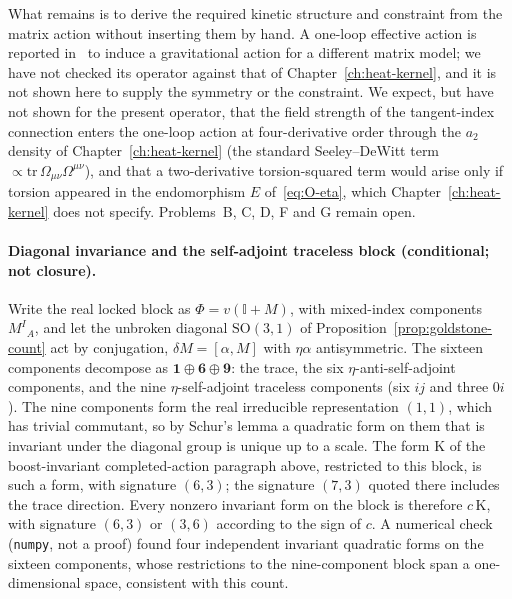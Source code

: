 What remains is to derive the required kinetic structure and constraint from
the matrix action without inserting them by hand.  A one-loop effective action
is reported in~\cite{MantaSteinackerTran2024} to induce a gravitational action
for a different matrix model; we have not checked its operator against that of
Chapter~\ref{ch:heat-kernel}, and it is not shown here to supply the symmetry
or the constraint.  We expect, but have not shown for the present operator,
that the field strength of the tangent-index connection enters the one-loop
action at four-derivative order through the \(a_2\) density of
Chapter~\ref{ch:heat-kernel} (the standard Seeley--DeWitt term
\(\propto\mathrm{tr}\,\Omega_{\mu\nu}\Omega^{\mu\nu}\)), and that a
two-derivative torsion-squared term would arise only if torsion appeared in
the endomorphism \(E\) of~\eqref{eq:O-eta}, which
Chapter~\ref{ch:heat-kernel} does not specify.  Problems~B, C, D, F and G
remain open.

\paragraph{Diagonal invariance and the self-adjoint traceless block
(conditional; not closure).}
Write the real locked block as \(\Phi=v(\mathbb{I}+M)\), with
mixed-index components \(M^I{}_A\), and let the unbroken diagonal
\(\mathrm{SO}(3,1)\) of Proposition~\ref{prop:goldstone-count} act by
conjugation, \(\delta M=[\alpha,M]\) with \(\eta\alpha\) antisymmetric.
The sixteen components decompose as \(\mathbf 1\oplus\mathbf 6\oplus\mathbf 9\):
the trace, the six \(\eta\)-anti-self-adjoint components, and the nine
\(\eta\)-self-adjoint traceless components (six \(ij\) and three \(0i\)).
The nine components form the real irreducible representation \((1,1)\),
which has trivial commutant, so by Schur's lemma a quadratic form on them
that is invariant under the diagonal group is unique up to a scale.  The
form \(\mathrm{K}\) of the boost-invariant completed-action paragraph above,
restricted to this block, is such a form, with signature \((6,3)\); the
signature \((7,3)\) quoted there includes the trace direction.  Every
nonzero invariant form on the block is therefore \(c\,\mathrm{K}\), with
signature \((6,3)\) or \((3,6)\) according to the sign of \(c\).  A
numerical check (\texttt{numpy}, not a proof) found four independent
invariant quadratic forms on the sixteen components, whose restrictions to
the nine-component block span a one-dimensional space, consistent with
this count.

